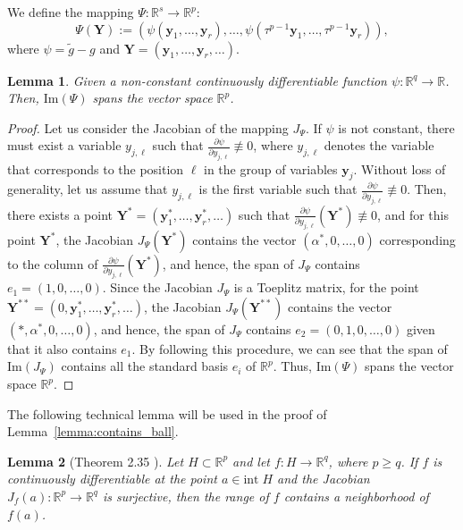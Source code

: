 \documentclass[letterpaper,10pt,journal]{IEEEtran}
\newcommand{\y}{\mathbf{y}}
\newcommand{\Y}{\mathbf{Y}}
\newtheorem{lemma}{Lemma}
\newcommand{\R}{\mathbb R}
\begin{document}
We define the mapping $\Psi:\R^s\to \R^p$:
\begin{equation}
\Psi(\Y):=(\psi(\y_1,\ldots,\y_r),\ldots,\psi(\tau^{p-1}\y_1,\ldots,\tau^{p-1}\y_r)),    
\end{equation}
where $\psi=\tilde g-g$ and $\Y=(\y_1,\ldots,\y_r,\ldots)$.
\begin{lemma}\label{lemma:basis}
    Given a non-constant continuously differentiable function  $\psi:\R^q\to\R$. Then, $\mathrm{Im}(\Psi)$ spans the vector \linebreak space $\R^p$.
\end{lemma}
\begin{proof}
    Let us consider the Jacobian of the mapping $J_\Psi$.
    If $\psi$ is not constant, there must exist a variable $y_{j,\ell}$ such that $\frac{\partial \psi}{\partial y_{j,\ell}}\not\equiv 0$, where $y_{j,\ell}$ denotes the variable that corresponds to the position $\ell$ in the group of variables $\y_j$. Without loss of generality, let us assume that $y_{j,\ell}$ is the first variable such that $\frac{\partial \psi}{\partial y_{j,\ell}}\not\equiv 0$. Then, there exists a point $\Y^*=(\y_1^*,\ldots,\y_r^*,\ldots)$ such that $\frac{\partial \psi}{\partial y_{j,\ell}}(\Y^*)\not\equiv  0$, and for this point $\Y^*$, the Jacobian $J_ \Psi(\Y^*)$ contains the vector $(\alpha^*,0,\ldots,0)$ corresponding to the column of $\frac{\partial \psi}{\partial y_{j,\ell}}(\Y^*)$, and hence, the span of $J_\Psi$ contains $e_1=(1,0,\ldots,0)$. Since the Jacobian $J_\Psi$ is a Toeplitz matrix, for the point $\Y^{**}=(0,\y_1^*,\ldots,\y_r^*,\ldots)$, the Jacobian $J_\Psi(\Y^{**})$ contains the vector $(*,\alpha^*,0,\ldots,0)$, and hence, the span of $J_\Psi$ contains $e_2=(0,1,0,\ldots,0)$ given that it also contains $e_1$. By following this procedure, we can see that the span of $\mathrm{Im}(J_\Psi)$ contains all the standard basis $e_i$ of $\R^p$. Thus, $\mathrm{Im}(\Psi)$ spans the vector space $\R^p$.
\end{proof}

The following technical lemma will be used in the proof of Lemma~\ref{lemma:contains_ball}.

\begin{lemma}[Theorem 2.35 \cite{laczkovich2017real}]\label{lemma:mapping}
    Let $H\subset \R^p$ and let $f:H\to\R^q$, where $p\ge q$. If $f$ is continuously differentiable at the point $a\in \text{int} \;H$ and the Jacobian $J_f(a):\R^p\to\R^q$ is surjective, then the range of $f$ contains a neighborhood of $f(a)$.
\end{lemma}
\end{document}
